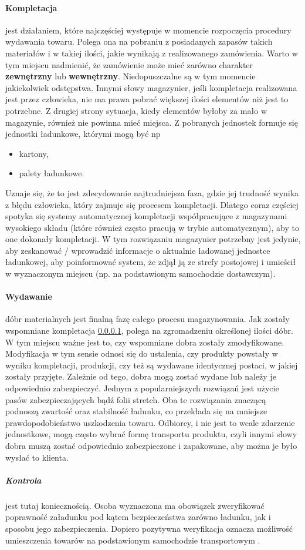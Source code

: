 	\paragraph{Kompletacja} \label{c4:kompletacja} jest działaniem, które najczęściej występuje w momencie rozpoczęcia procedury
	wydawania towaru. Polega ona na pobraniu z posiadanych zapasów takich materiałów i w takiej ilości, jakie
	wynikają z realizowanego zamówienia. Warto w tym miejscu nadmienić, że zamówienie może mieć zarówno
	charakter \textbf{zewnętrzny} lub \textbf{wewnętrzny}. Niedopuszczalne są w tym momencie jakiekolwiek odstępstwa. Innymi słowy
	magazynier, jeśli kompletacja realizowana jest przez człowieka, nie ma prawa pobrać większej ilości elementów niż
	jest to potrzebne. Z drugiej strony sytuacja, kiedy elementów byłoby za mało w magazynie, również nie 
	powinna mieć miejsca. Z pobranych jednostek formuje się jednostki ładunkowe, którymi mogą być np
	\begin{itemize}
		\item kartony,
		\item palety ładunkowe.
	\end{itemize}
	Uznaje się, że to jest zdecydowanie najtrudniejsza faza, gdzie jej trudność wynika z błędu człowieka, który zajmuje się
	procesem kompletacji. Dlatego coraz częściej spotyka się systemy automatycznej kompletacji współpracujące z magazynami
	wysokiego składu (które również często pracują w trybie automatycznym), aby to one dokonały kompletacji. W tym rozwiązaniu
	magazynier potrzebny jest jedynie, aby zeskanować / wprowadzić informacje o aktualnie ładowanej jednostce ładunkowej, aby
	poinformować system, że zdjął ją ze strefy postojowej i umieścił w wyznaczonym miejscu (np. na podstawionym samochodzie
	dostawczym). 	
	\paragraph{Wydawanie} dóbr materialnych jest finalną fazę całego procesu magazynowania. 
	Jak zostały wspomniane kompletacja \ref{c4:kompletacja}, polega na zgromadzeniu określonej ilości dóbr. W tym miejscu
	ważne jest to, czy wspomniane dobra zostały zmodyfikowane. Modyfikacja w tym sensie odnosi się do ustalenia, czy produkty
	powstały w wyniku kompletacji, produkcji, czy też są wydawane identycznej postaci, w jakiej zostały przyjęte. Zależnie
	od tego, dobra mogą zostać wydane lub należy je odpowiednio zabezpieczyć. Jednym z popularniejszych rozwiązań jest użycie
	pasów zabezpieczających bądź folii stretch. Oba te rozwiązania znaczącą podnoszą zwartość oraz stabilność ładunku, co
	przekłada się na mniejsze prawdopodobieństwo uszkodzenia towaru. Odbiorcy, i nie jest to wcale zdarzenie jednostkowe,
	mogą często wybrać formę transportu produktu, czyli innymi słowy dobra muszą zostać odpowiednio zabezpieczone i zapakowane,
	aby można je było wysłać to klienta. 
		\subparagraph{Kontrola} jest tutaj koniecznością. Osoba wyznaczona ma obowiązek zweryfikować poprawność załadunku pod kątem
		bezpieczeństwa zarówno ładunku, jak i sposobu jego zabezpieczenia. Dopiero pozytywna weryfikacja oznacza możliwość umieszczenia
		towarów na podstawionym samochodzie transportowym \cite{PL_FM}.
		
